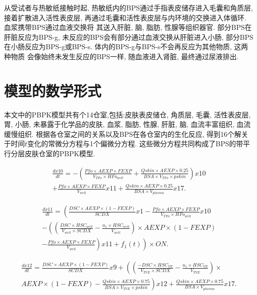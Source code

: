 \documentclass[a4paper,punct=banjiao,twoside]{ctexrep}
\theoremstyle{plain}
\theoremstyle{definition}
\theoremstyle{remark}
\begin{document}
从受试者与热敏纸接触时起, 热敏纸内的BPS通过手指表皮储存进入毛囊和角质层, 接着扩散进入活性表皮层, 再通过毛囊和活性表皮层与内环境的交换进入体循环. 血浆携带BPS通过血液交换将
其送入肝脏, 脑, 脂肪, 性腺等组织器官. 部分BPS在肝脏反应为BPS-g, 未反应的BPS会有部分通过血液交换从肝脏进入小肠, 部分BPS在小肠反应为BPS-g或BPS-s. 体内的BPS-g与BPS-s不会再反应为其他物质, 这两种物质
会像始终未发生反应的BPS一样, 随血液进入肾脏, 最终通过尿液排出. 

 
\section{模型的数学形式}
本文中的PBPK模型共有个14仓室,包括:皮肤表皮储仓, 角质层, 毛囊, 活性表皮层, 胃, 小肠, 未暴露于化学品的皮肤, 血浆, 脂肪, 性腺, 肝脏, 脑, 血流丰富组织, 血流缓慢组织. 
根据各仓室之间的关系以及BPS在各仓室内的生化反应, 得到16个解关于时间$t$变化的常微分方程与1个偏微分方程. 这些微分方程共同构成了BPS的带平行分层皮肤仓室的PBPK模型.  

\begin{multline}\label{eq10}
  \frac{dx10}{dt} = -\left(\frac{Pfo \times  AEXP \times  FEXP}{V_{TFo}  \times  HFo_{well} }
  +\frac{Qskin \times  AEXP \times  0.25}{BSA \times  V_{TFo}  \times  pskin}\right)x10\\
  +\frac{Pfo \times  AEXP \times  FEXP}{V_{well}  }x11+\frac{Qskin \times  AEXP \times  0.25}{BSA \times  V_{plasma}} x17.
\end{multline}

\begin{multline}\label{eq11}
  \frac{dx11}{dt} = \left(\frac{DSC \times  AEXP \times  (1-FEXP)}{SCDX} x1-\frac{Pfo \times  AEXP \times  FEXP}{V_{TFo} \times  HFo_{well}} x10\right.\\
  \left. -\left(\left(\frac{DSC \times  HSC_{well}}{V_{well} \times  SCDX}-\frac{u_1 \times  HSC_{well}}{V_{well} }\right) \times  AEXP \times  (1-FEXP) \right.\right.\\
  \left.\left.-\frac{Pfo \times  AEXP \times  FEXP}{V_{well}} \right)x11+f_1 (t) \right) \times  ON.
\end{multline}


\begin{multline}\label{eq12}
  \frac{dx12}{dt}=\frac{DSC \times  AEXP \times  (1-FEXP)}{SCDX} x9+\left(\left(\frac{-DSC \times  HSC_{VE}}{V_{TVE}  \times  SCDX}-\frac{u_1  \times  HSC_{VE}}{V_{TVE} }\right)\times \right.\\ 
   \left.AEXP \times  (1-FEXP)-\frac{Qskin \times  AEXP \times  0.75}{BSA \times  V_{TVE}  \times  pskin}\right)x12+\frac{Qskin \times  AEXP \times  0.75}{BSA \times  V_{plasma} } x17.
\end{multline}
\end{document}
